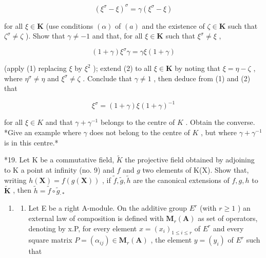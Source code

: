 \[
(\xi^ {\sigma} - \xi) ^ {\sigma} = \gamma (\xi^ {\sigma} - \xi)\tag{1}
\]

for all \(\xi \in \mathbf{K}\) (use conditions \((\alpha)\) of \((a)\) and the existence of \(\zeta \in \mathbf{K}\) such that \(\zeta^{\sigma} \neq \zeta\) ). Show that \(\gamma \neq -1\) and that, for all \(\xi \in \mathbf{K}\) such that \(\xi^{\sigma} \neq \xi\) ,

\[
(1 + \gamma) \xi^ {\sigma} \gamma = \gamma \xi (1 + \gamma)\tag{2}
\]

(apply (1) replacing \(\xi\) by \(\xi^2\) ); extend (2) to all \(\xi \in \mathbf{K}\) by noting that \(\xi = \eta - \zeta\) , where \(\eta^\sigma \neq \eta\) and \(\xi^\sigma \neq \zeta\) . Conclude that \(\gamma \neq 1\) , then deduce from (1) and (2) that

\[
\xi^ {\sigma} = (1 + \gamma) \xi (1 + \gamma) ^ {- 1}\tag{3}
\]

for all \(\xi \in K\) and that \(\gamma + \gamma^{-1}\) belongs to the centre of \(K\) . Obtain the converse. *Give an example where \(\gamma\) does not belong to the centre of \(K\) , but where \(\gamma + \gamma^{-1}\) is in this centre.*

*19. Let K be a commutative field, \(\tilde{K}\) the projective field obtained by adjoining to K a point at infinity (no. 9) and \(f\) and \(g\) two elements of K(X). Show that, writing \(h(\mathbf{X}) = f(g(\mathbf{X}))\) , if \(\tilde{f}, \tilde{g}, \tilde{h}\) are the canonical extensions of \(f, g, h\) to \(\tilde{\mathbf{K}}\) , then \(\tilde{h} = \tilde{f} \circ \tilde{g}_{\cdot *}\)

\BourbakiExercisesSection

\begin{enumerate}
\def\labelenumi{\arabic{enumi}.}
\tightlist
\item
  \begin{enumerate}
  \def\labelenumii{(\alph{enumii})}
  \tightlist
  \item
    Let E be a right A-module. On the additive group \(E^{r}\) (with \(r \geqslant 1\) ) an external law of composition is defined with \(\mathbf{M}_{r}(\mathbf{A})\) as set of operators, denoting by x.P, for every element \(x = (x_{i})_{1 \leqslant i \leqslant r}\) of \(E^{r}\) and every square matrix \(P = (\alpha_{ij}) \in \mathbf{M}_{r}(\mathbf{A})\) , the element \(y = (y_{i})\) of \(E^{r}\) such that
  \end{enumerate}
\end{enumerate}

